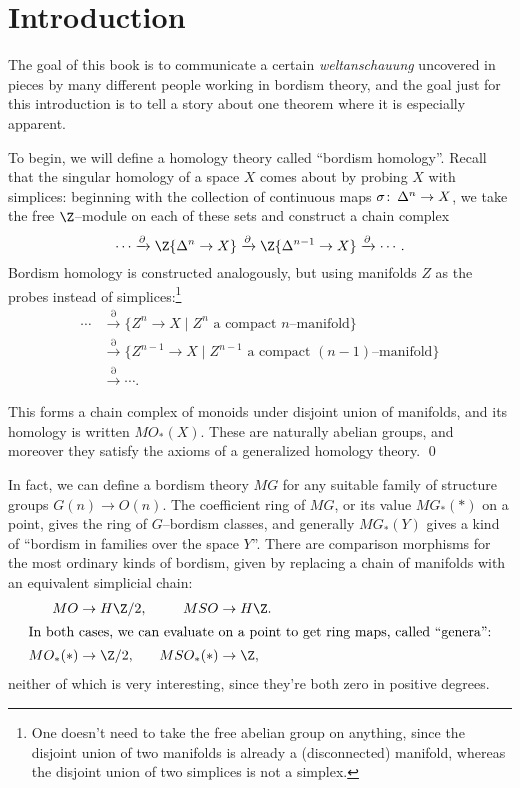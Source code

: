 
\setcounter{chapter}{-1}
\chapter{Introduction}

\label{IntroductionSection}

The goal of this book is to communicate a certain \textit{weltanschauung} uncovered in pieces by many different people working in bordism theory, and the goal just for this introduction is to tell a story about one theorem where it is especially apparent.

To begin, we will define a homology theory called ``bordism homology''.  Recall that the singular homology of a space $X$ comes about by probing $X$ with simplices: beginning with the collection of continuous maps $\sigma\colon\thinspace \Delta^n \to X$, we take the free $\Z$--module on each of these sets and construct a chain complex \[\cdots \xrightarrow{\partial} \Z\{\Delta^n \to X\} \xrightarrow{\partial} \Z\{\Delta^{n-1} \to X\} \xrightarrow{\partial} \cdots.\]  Bordism homology is constructed analogously, but using manifolds $Z$ as the probes instead of simplices:\footnote{One doesn't need to take the free abelian group on anything, since the disjoint union of two manifolds is already a (disconnected) manifold, whereas the disjoint union of two simplices is not a simplex.}
\begin{align*}
\cdots & \xrightarrow{\partial} \{Z^n \to X \mid \text{$Z^n$ a compact $n$--manifold}\} \\
& \xrightarrow{\partial} \{Z^{n-1} \to X \mid \text{$Z^{n-1}$ a compact $(n-1)$--manifold}\} \\
& \xrightarrow{\partial} \cdots.
\end{align*}

\begin{lemma}\label{OriginalDefnOfBordism}
This forms a chain complex of monoids under disjoint union of manifolds, and its homology is written $MO_*(X)$.  These are naturally abelian groups, and moreover they satisfy the axioms of a generalized homology theory. \qed
\end{lemma}

In fact, we can define a bordism theory $MG$ for any suitable family of structure groups $G(n) \to O(n)$.  The coefficient ring of $MG$, or its value $MG_*(*)$ on a point, gives the ring of $G$--bordism classes, and generally $MG_*(Y)$ gives a kind of ``bordism in families over the space $Y$''.  There are comparison morphisms for the most ordinary kinds of bordism, given by replacing a chain of manifolds with an equivalent simplicial chain:
\begin{align*}
MO & \to H\Z/2, &
MSO & \to H\Z. \\
\intertext{In both cases, we can evaluate on a point to get ring maps, called ``genera'':}
MO_*(*) & \to \Z/2, &
MSO_*(*) & \to \Z,
\end{align*}
neither of which is very interesting, since they're both zero in positive degrees.

